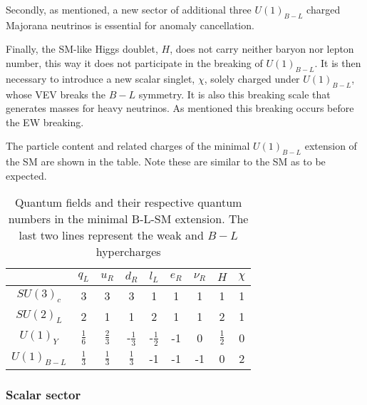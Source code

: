 Secondly, as mentioned, a new sector of additional three $U(1)_{B-L}$ charged Majorana neutrinos is essential for anomaly cancellation. 

Finally, the SM-like Higgs doublet, $H$, does not carry neither baryon nor lepton number, this way it does not participate in the breaking of $U(1)_{B-L}$. It is then necessary to introduce a new scalar singlet, $\chi$, solely charged under $U(1)_{B-L}$, whose VEV breaks the $B-L$ symmetry. It is also this breaking scale that generates masses for heavy neutrinos. As mentioned this breaking occurs before the EW breaking.

The particle content and related charges of the minimal $U(1)_{B-L}$ extension of the SM are shown in the table. Note these are similar to the SM as to be expected. 

\begin{table}[htb!]
\centering
\begin{tabular}{|c|c|c|c|c|c|c|c|c|}
\hline
  & $q_L$  & $u_R$ & $d_R$ & $l_L$  & $e_R$ & $\nu_R$  &  $H$  & $\chi$  \\ \hline
 $SU(3)_c$& 3 & 3 & 3 & 1 & 1 & 1 & 1  & 1  \\
 $SU(2)_L$& 2  & 1 & 1 & 2 & 1 & 1 & 2  & 1 \\
$U(1)_Y$ & $\frac{1}{6}$ & $\frac{2}{3}$  & -$\frac{1}{3}$  & -$\frac{1}{2}$ & -1 & 0 & $\frac{1}{2}$ & 0 \\
$U(1)_{B-L}$ & $\frac{1}{3}$ & $\frac{1}{3}$ & $\frac{1}{3}$  & -1  & -1 &-1  & 0 & 2  \\ \hline 
\end{tabular}
\caption{Quantum fields and their respective quantum numbers in the minimal B-L-SM extension. The last two lines represent the weak and $B-L$ hypercharges}
\label{tab:charges}
\end{table} 

\subsubsection{Scalar sector}

